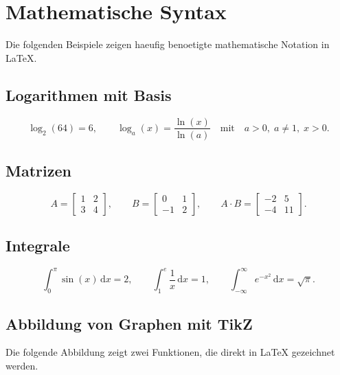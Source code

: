 \section{Mathematische Syntax}
Die folgenden Beispiele zeigen haeufig benoetigte mathematische Notation in LaTeX.

\subsection{Logarithmen mit Basis}
\begin{equation}
    \log_2(64) = 6,
    \qquad
    \log_a(x) = \frac{\ln(x)}{\ln(a)}
    \quad \text{mit} \quad a > 0,\; a \neq 1,\; x > 0.
    \label{eq:logarithmen}
\end{equation}

\subsection{Matrizen}
\begin{equation}
    A =
    \begin{bmatrix}
        1 & 2 \\
        3 & 4
    \end{bmatrix},
    \qquad
    B =
    \begin{bmatrix}
        0 & 1 \\
        -1 & 2
    \end{bmatrix},
    \qquad
    A \cdot B =
    \begin{bmatrix}
        -2 & 5 \\
        -4 & 11
    \end{bmatrix}.
    \label{eq:matrizen}
\end{equation}

\subsection{Integrale}
\begin{equation}
    \int_0^{\pi} \sin(x)\,\mathrm{d}x = 2,
    \qquad
    \int_1^{e} \frac{1}{x}\,\mathrm{d}x = 1,
    \qquad
    \int_{-\infty}^{\infty} e^{-x^2}\,\mathrm{d}x = \sqrt{\pi}.
    \label{eq:integrale}
\end{equation}

\subsection{Abbildung von Graphen mit TikZ}
Die folgende Abbildung zeigt zwei Funktionen, die direkt in LaTeX gezeichnet werden.

